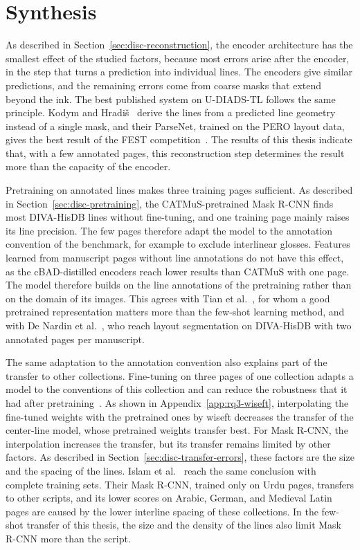 \FloatBarrier

\section{Synthesis}
\label{sec:disc-synthesis}

As described in Section~\ref{sec:disc-reconstruction}, the encoder architecture has the smallest effect of the studied factors, because most errors arise after the encoder, in the step that turns a prediction into individual lines. The encoders give similar predictions, and the remaining errors come from coarse masks that extend beyond the ink. The best published system on U-DIADS-TL follows the same principle. Kodym and Hradi\v{s}~\cite{kodym2021page} derive the lines from a predicted line geometry instead of a single mask, and their ParseNet, trained on the PERO layout data, gives the best result of the FEST competition~\cite{Zottin_2025_FEST}. The results of this thesis indicate that, with a few annotated pages, this reconstruction step determines the result more than the capacity of the encoder.

Pretraining on annotated lines makes three training pages sufficient. As described in Section~\ref{sec:disc-pretraining}, the CATMuS-pretrained Mask R-CNN finds most DIVA-HisDB lines without fine-tuning, and one training page mainly raises its line precision. The few pages therefore adapt the model to the annotation convention of the benchmark, for example to exclude interlinear glosses. Features learned from manuscript pages without line annotations do not have this effect, as the cBAD-distilled encoders reach lower results than CATMuS with one page. The model therefore builds on the line annotations of the pretraining rather than on the domain of its images. This agrees with Tian et al.~\cite{tian2020rethinking}, for whom a good pretrained representation matters more than the few-shot learning method, and with De Nardin et al.~\cite{De_Nardin_2023}, who reach layout segmentation on DIVA-HisDB with two annotated pages per manuscript.

The same adaptation to the annotation convention also explains part of the transfer to other collections. Fine-tuning on three pages of one collection adapts a model to the conventions of this collection and can reduce the robustness that it had after pretraining~\cite{wortsman2022wiseft}. As shown in Appendix~\ref{app:rq3-wiseft}, interpolating the fine-tuned weights with the pretrained ones by \gls{wiseft} decreases the transfer of the center-line model, whose pretrained weights transfer best. For Mask R-CNN, the interpolation increases the transfer, but its transfer remains limited by other factors. As described in Section~\ref{sec:disc-transfer-errors}, these factors are the size and the spacing of the lines. Islam et al.~\cite{Textline_maskrcnn} reach the same conclusion with complete training sets. Their Mask R-CNN, trained only on Urdu pages, transfers to other scripts, and its lower scores on Arabic, German, and Medieval Latin pages are caused by the lower interline spacing of these collections. In the few-shot transfer of this thesis, the size and the density of the lines also limit Mask R-CNN more than the script.

